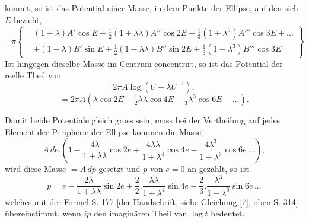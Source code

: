 \noindent kommt, so ist das Potential einer Masse, in dem Punkte der Ellipse, auf den sich $E$ bezieht,
{\small\begin{equation}
-\pi\left\{\begin{aligned}
&(1+\lambda)A'\cos E+\tfrac12(1+\lambda\lambda)A''\cos2E+\tfrac13(1+\lambda^3)A'''\cos3E+{.}{.}{.}\\
&+(1-\lambda)B'\sin E+\tfrac12(1-\lambda\lambda)B''\sin2E+\tfrac13(1-\lambda^3)B'''\cos3E
\end{aligned}\right\}\tag*{[11]}
\end{equation}}
\noindent Ist hingegen dieselbe Masse im Centrum concentrirt, so ist das Potential der reelle Theil von
\[2\pi A\log(U+\lambda U^{-1}),\]
\noindent [also]
\begin{equation}
=2\pi A(\lambda\cos2E-\tfrac12\lambda\lambda\cos4E+\tfrac13\lambda^3\cos6E-{.}{.}{.}).\tag*{[12]}
\end{equation}
\noindent {\small[S. 223]}
\par\indent Damit beide Potentiale gleich gross sein, muss bei der Vertheilung auf jedes Element der Peripherie der Ellipse kommen die Masse
\begin{equation}
A\,de.\left(1-\frac{4\lambda}{1+\lambda\lambda}\cos2e+\frac{4\lambda\lambda}{1+\lambda^4}\cos4e-\frac{4\lambda^3}{1+\lambda^6}\cos6e\,{.}{.}{.}\right);\tag*{[13]}
\end{equation}
\noindent wird diese Masse $=A\,dp$ gesetzt und $p$ von $e=0$ an gezählt, so ist
\[
p=e-\frac{2\lambda}{1+\lambda\lambda}\sin2e+\frac22.\frac{\lambda\lambda}{1+\lambda^4}\sin4e-\frac23.\frac{\lambda^3}{1+\lambda^6}\sin6e\,{.}{.}{.}
\]
\noindent welches mit der Formel S. 177 [der Handschrift, siehe Gleichung [7], oben S. 314] übereinstimmt, wenn $ip$ den imaginären Theil von $\log t$ bedeutet.
\clearpage
\endgroup
